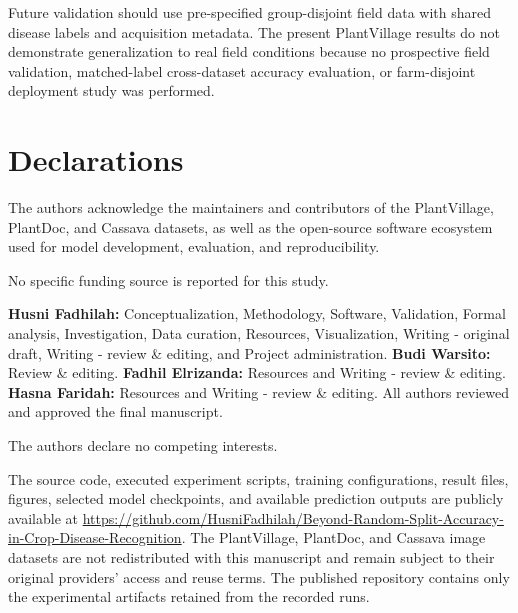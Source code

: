 \documentclass{sbc2023}%
\begin{document}
Future validation should use pre-specified group-disjoint field data with shared disease labels and acquisition metadata. The present PlantVillage results do not demonstrate generalization to real field conditions because no prospective field validation, matched-label cross-dataset accuracy evaluation, or farm-disjoint deployment study was performed.

\section*{Declarations}

\begin{acknowledgements}
The authors acknowledge the maintainers and contributors of the PlantVillage, PlantDoc, and Cassava datasets, as well as the open-source software ecosystem used for model development, evaluation, and reproducibility.
\end{acknowledgements}

\begin{funding}
No specific funding source is reported for this study.
\end{funding}

\begin{contributions}
\textbf{Husni Fadhilah:} Conceptualization, Methodology, Software, Validation, Formal analysis, Investigation, Data curation, Resources, Visualization, Writing - original draft, Writing - review \& editing, and Project administration. 
\textbf{Budi Warsito:} Review \& editing. 
\textbf{Fadhil Elrizanda:} Resources and Writing - review \& editing. 
\textbf{Hasna Faridah:} Resources and Writing - review \& editing. All authors reviewed and approved the final manuscript.
\end{contributions}

\begin{interests}
The authors declare no competing interests.
\end{interests}

\begin{materials}
The source code, executed experiment scripts, training configurations, result files, figures, selected model checkpoints, and available prediction outputs are publicly available at \url{https://github.com/HusniFadhilah/Beyond-Random-Split-Accuracy-in-Crop-Disease-Recognition}. The PlantVillage, PlantDoc, and Cassava image datasets are not redistributed with this manuscript and remain subject to their original providers' access and reuse terms. The published repository contains only the experimental artifacts retained from the recorded runs.
\end{materials}



\end{document}
